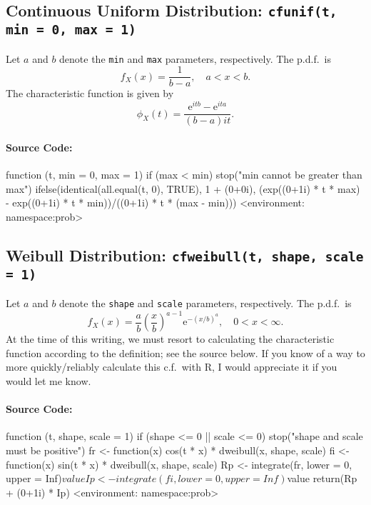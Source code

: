 \documentclass[english]{article}
\newcommand{\me}{\mathrm{e}}
\begin{document}
\subsection{Continuous Uniform Distribution: \texttt{cfunif(t, min = 0, max =
1)}}

Let $a$ and $b$ denote the \texttt{min} and \texttt{max} parameters,
respectively. The p.d.f.~is\[
f_{X}(x)=\frac{1}{b-a},\quad a<x<b.\]
The characteristic function is given by\[
\phi_{X}(t)=\frac{\me^{itb}-\me^{ita}}{(b-a)it}.\]



\paragraph*{Source Code:}

\begin{Schunk}
\begin{Soutput}
function (t, min = 0, max = 1) 
{
    if (max < min) 
        stop("min cannot be greater than max")
    ifelse(identical(all.equal(t, 0), TRUE), 1 + (0+0i), (exp((0+1i) * 
        t * max) - exp((0+1i) * t * min))/((0+1i) * t * (max - 
        min)))
}
<environment: namespace:prob>
\end{Soutput}
\end{Schunk}


\subsection{Weibull Distribution: \texttt{cfweibull(t, shape, scale = 1)}}

Let $a$ and $b$ denote the \texttt{shape} and \texttt{scale} parameters,
respectively. The p.d.f.~is\[
f_{X}(x)=\frac{a}{b}\left(\frac{x}{b}\right)^{a-1}\me^{-(x/b)^{a}},\quad0<x<\infty.\]
At the time of this writing, we must resort to calculating the characteristic
function according to the definition; see the source below. If you
know of a way to more quickly/reliably calculate this c.f.~with \textsf{R},
I would appreciate it if you would let me know. 


\paragraph*{Source Code:}

\begin{Schunk}
\begin{Soutput}
function (t, shape, scale = 1) 
{
    if (shape <= 0 || scale <= 0) 
        stop("shape and scale must be positive")
    fr <- function(x) cos(t * x) * dweibull(x, shape, scale)
    fi <- function(x) sin(t * x) * dweibull(x, shape, scale)
    Rp <- integrate(fr, lower = 0, upper = Inf)$value
    Ip <- integrate(fi, lower = 0, upper = Inf)$value
    return(Rp + (0+1i) * Ip)
}
<environment: namespace:prob>
\end{Soutput}
\end{Schunk}
\end{document}
